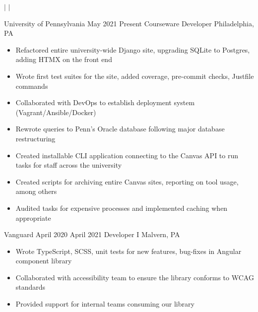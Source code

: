 \documentclass{article}
\begin{document}
\begin{center}
  \name{\fullName}

  \vspace{0.2em}

  \link{\email}
    $|$
    \small{\phone}
    $|$
    \link{\github}
\end{center}


\begin{itemize}[leftmargin=0em, label={}]
    \experience
        {University of Pennsylvania}
        {May 2021}
        {Present}
        {Courseware Developer}
        {Philadelphia, PA}
        \begin{itemize}
          \item \small Refactored entire university-wide Django site, upgrading
            SQLite to Postgres, adding HTMX on the front end
          \item \small Wrote first test suites for the site, added coverage,
            pre-commit checks, Justfile commands
          \item \small Collaborated with DevOps to establish deployment system
            (Vagrant/Ansible/Docker)
          \item \small Rewrote queries to Penn’s Oracle database following major
            database restructuring
          \item \small Created installable CLI application connecting to the
            Canvas API to run tasks for staff across the university
          \item \small Created scripts for archiving entire Canvas sites,
            reporting on tool usage, among others
          \item \small Audited tasks for expensive processes and implemented
            caching when appropriate
        \end{itemize}
    \experience
        {Vanguard}
        {April 2020}
        {April 2021}
        {Developer I}
        {Malvern, PA}
        \begin{itemize}
          \item \small Wrote TypeScript, SCSS, unit tests for new features,
            bug-fixes in Angular component library
          \item \small Collaborated with accessibility team to ensure the
            library conforms to WCAG standards
          \item \small Provided support for internal teams consuming our library

\end{itemize}
\end{itemize}
\end{document}
